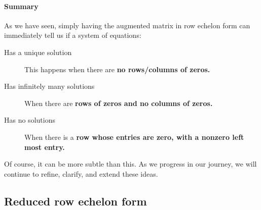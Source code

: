 \documentclass{ximera}
\begin{document}
\paragraph{Summary}

As we have seen, simply having the augmented matrix in row echelon form can immediately tell us if a system of equations:

\begin{description}
\item[Has a unique solution] This happens when there are \textbf{no rows/columns of zeros.}
\item[Has infinitely many solutions] When there are \textbf{rows of
  zeros and no columns of zeros.}
\item[Has no solutions] When there is a \textbf{row whose entries are
  zero, with a nonzero left most entry.}
\end{description}
Of course, it can be more subtle than this. As we progress in our
journey, we will continue to refine, clarify, and extend these ideas.





\subsection{Reduced row echelon form}
\end{document}
